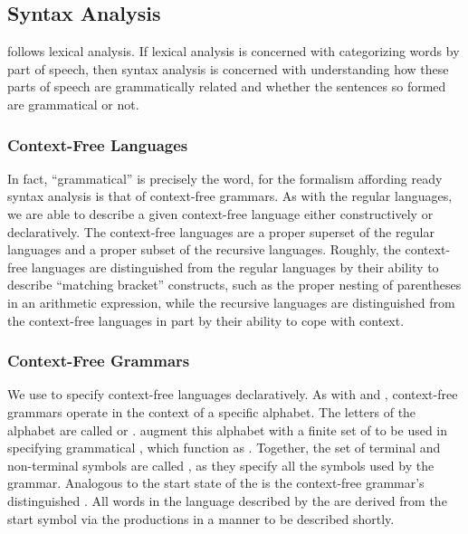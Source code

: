 \subsection{Syntax Analysis}
 follows lexical analysis. If lexical analysis is concerned with categorizing words by part of speech, then syntax analysis is concerned with understanding how these parts of speech are grammatically related and whether the sentences so formed are grammatical or not.

\subsubsection{Context-Free Languages}
In fact, ``grammatical'' is precisely the word, for the formalism affording ready syntax analysis is that of context-free grammars. As with the regular languages, we are able to describe a given context-free language either constructively or declaratively. The context-free languages are a proper superset of the regular languages and a proper subset of the recursive languages. Roughly, the context-free languages are distinguished from the regular languages by their ability to describe ``matching bracket'' constructs, such as the proper nesting of parentheses in an arithmetic expression, while the recursive languages are distinguished from the context-free languages in part by their ability to cope with context.

\subsubsection{Context-Free Grammars}
We use  to specify context-free languages declaratively. As with \regexes and \FAs, context-free grammars operate in the context of a specific alphabet. The letters of the alphabet are called  or . \CFGs[C] augment this alphabet with a finite set of  to be used in specifying grammatical , which function as . Together, the set of terminal and non-terminal symbols are called , as they specify all the symbols used by the grammar. Analogous to the start state of the \FA is the context-free grammar's distinguished . All words in the language described by the \CFG are derived from the start symbol via the productions in a manner to be described shortly.

